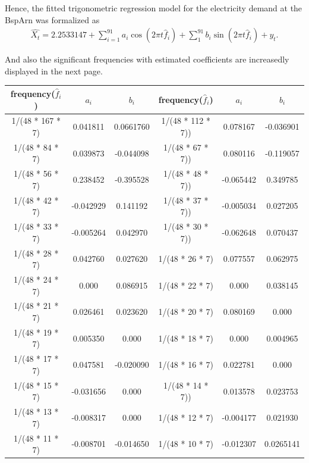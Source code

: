 \documentclass[12pt,msc]{uom_eee_dissertation_casson}
\begin{document}
Hence, the fitted trigonometric regression model for the electricity demand at the BspArn was formalized as
\begin{equation}
\label{eq:3-3}
\begin{aligned}
\hat{X_{t}}= 2.2533147 +\sum^{91}_{i=1} a_{i}\cos(2\pi t\hat{f}_{i}) +\sum^{91}_{1} b_{i}\sin(2\pi t\hat{f}_{i})+y_{t}.
\end{aligned}
\end{equation}

And also the significant frequencies with estimated coefficients are increasedly displayed in the next page.
\begin{table}
\centering
\begin{tabular}{| c | c | c | c | c | c |}
		\hline
        frequency($\hat{f}_{i}$) & $a_{i}$ & $b_{i}$ & frequency($\hat{f}_{i}$) & $a_{i}$ & $b_{i}$\\ \hline
1/(48 * 167 * 7) &  0.041811 &  0.0661760& 1/(48 * 112 * 7))  &  0.078167 & -0.036901\\ \hline
1/(48 * 84 * 7)  &  0.039873 & -0.044098 & 1/(48 * 67 * 7))   &  0.080116 & -0.119057\\ \hline
1/(48 * 56 * 7)  &  0.238452 & -0.395528 & 1/(48 * 48 * 7))   & -0.065442 &  0.349785 \\ \hline
1/(48 * 42 * 7)  & -0.042929 &  0.141192 & 1/(48 * 37 * 7))   & -0.005034 &  0.027205 \\ \hline
1/(48 * 33 * 7)  & -0.005264 &  0.042970 & 1/(48 * 30 * 7))   & -0.062648 &  0.070437 \\ \hline
1/(48 * 28 * 7)  &  0.042760 &  0.027620 & 1/(48 * 26 * 7)    &  0.077557 &  0.062975 \\ \hline
1/(48 * 24 * 7)  &  0.000    &  0.086915 & 1/(48 * 22 * 7)    &  0.000    &  0.038145 \\ \hline
1/(48 * 21 * 7)  &  0.026461 &  0.023620 & 1/(48 * 20 * 7)    &  0.080169 &  0.000  \\ \hline
1/(48 * 19 * 7)  &  0.005350 &  0.000    & 1/(48 * 18 * 7)    &  0.000    &  0.004965 \\ \hline
1/(48 * 17 * 7)  &  0.047581 & -0.020090 & 1/(48 * 16 * 7)    &  0.022781 &  0.000 \\ \hline
1/(48 * 15 * 7)  & -0.031656 &  0.000    & 1/(48 * 14 * 7))   &  0.013578 &  0.023753 \\ \hline
1/(48 * 13 * 7)  & -0.008317 &  0.000    & 1/(48 * 12 * 7)    & -0.004177 &  0.021930 \\ \hline
1/(48 * 11 * 7)  & -0.008701 & -0.014650 & 1/(48 * 10 * 7)    & -0.012307 &  0.0265141 \\ \hline

\end{tabular}
\end{table}
\end{document}
